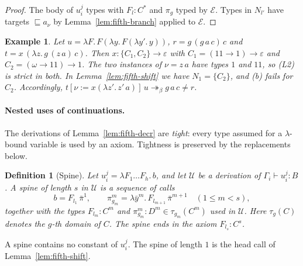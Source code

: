 \documentclass[10pt,a4paper]{article}
\theoremstyle{plain}%
\newtheorem{definition}[theorem]{Definition}
\newtheorem{example}[theorem]{Example}
\begin{document}
\begin{proof}
The body of $u_i^j$ types with $F_l : C^*$ and $\pi_g$ typed by $\mathcal{E}$.
Types in $N_{l'}$ have targets $\sqsubseteq a_\nu$ by Lemma~\ref{lem:fifth-branch} applied to $\mathcal{E}$.
\end{proof}

\begin{example}
Let $u = \lambda F.\,F(\lambda y.\,F(\lambda y'.\,y))$, $r = g\,(g\,a\,c)\,c$ and $t = x\,(\lambda z.\,g\,(z\,a)\,c)$.
Then $x : \{C_1, C_2\} \to \varepsilon$ with $C_1 = (11 \to 1) \to \varepsilon$ and $C_2 = (\omega \to 11) \to 1$.
The two instances of $\nu = z\,a$ have types $1$ and $11$, so (L2) is strict in both.
In Lemma~\ref{lem:fifth-shift} we have $N_1 = \{C_2\}$, and (b) fails for $C_2$.
Accordingly, $t[\nu := x(\lambda z'.\,z'\,a)]\,u \twoheadrightarrow_\beta g\,a\,c \neq r$.
\end{example}

\paragraph{Nested uses of continuations.}
The derivations of Lemma~\ref{lem:fifth-decr} are \emph{tight}: every type assumed for a $\lambda$-bound variable is used by an axiom.
Tightness is preserved by the replacements below.

\begin{definition}[Spine]
Let $u_i^j = \lambda F_1\ldots F_h.\,b$, and let $\mathcal{U}$ be a derivation of $\Gamma_i \vdash u_i^j : B$.
A \emph{spine} of length $s$ in $\mathcal{U}$ is a sequence of calls
\[
b = F_{l_1}\,\bar\pi^1,
\qquad
\pi^m_{g_m} = \lambda \bar y^m.\,F_{l_{m+1}}\,\bar\pi^{m+1}\quad (1 \le m < s),
\]
together with the types $F_{l_m} : C^m$ and $\pi^m_{g_m} : D^m \in \tau_{g_m}(C^m)$ used in $\mathcal{U}$.
Here $\tau_g(C)$ denotes the $g$-th domain of $C$.
The spine \emph{ends} in the axiom $F_{l_s} : C^s$.
\end{definition}

A spine contains no constant of $u_i^j$.
The spine of length $1$ is the head call of Lemma~\ref{lem:fifth-shift}.
\end{document}
